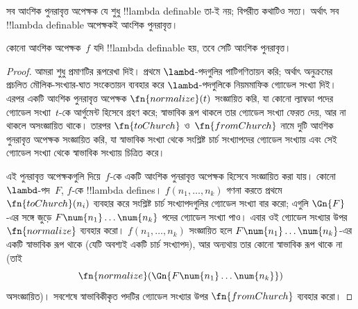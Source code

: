 \documentclass[../../../include/open-logic-section]{subfiles}
\begin{document}

সব আংশিক পুনরাবৃত্ত অপেক্ষক যে শুধু !!{lambda definable} তা-ই নয়;
বিপরীত কথাটিও সত্য। অর্থাৎ সব !!{lambda definable} অপেক্ষকই আংশিক
পুনরাবৃত্ত।

\begin{thm}
   কোনো আংশিক অপেক্ষক~$f$ যদি
  !!{lambda definable} হয়, তবে সেটি আংশিক পুনরাবৃত্ত।
\end{thm}

\begin{proof}
  আমরা শুধু প্রমাণটির রূপরেখা দিই। প্রথমে $\lambd$-পদগুলির পাটিগণিতায়ন
  করি; অর্থাৎ অনুক্রমের প্রচলিত মৌলিক-সংখ্যার-ঘাত সংকেতায়ন ব্যবহার করে
  $\lambd$-পদগুলিকে নিয়মমাফিক গ্যোডেল সংখ্যা দিই। এরপর একটি আংশিক
  পুনরাবৃত্ত অপেক্ষক $\fn{normalize}(t)$ সংজ্ঞায়িত করি, যা কোনো ল্যাম্বডা
  পদের গ্যোডেল সংখ্যা~$t$-কে আর্গুমেন্ট হিসেবে গ্রহণ করে; স্বাভাবিক রূপ
  থাকলে তার গ্যোডেল সংখ্যা ফেরত দেয়, আর না থাকলে অসংজ্ঞায়িত থাকে। তারপর
  $\fn{toChurch}$ ও~$\fn{fromChurch}$ নামে দুটি আংশিক পুনরাবৃত্ত অপেক্ষক
  সংজ্ঞায়িত করি, যা স্বাভাবিক সংখ্যা থেকে সংশ্লিষ্ট চার্চ সংখ্যাপদের
  গ্যোডেল সংখ্যায় এবং সেই গ্যোডেল সংখ্যা থেকে স্বাভাবিক সংখ্যায় চিত্রিত
  করে।

  এই পুনরাবৃত্ত অপেক্ষকগুলি দিয়ে~$f$-কে একটি আংশিক পুনরাবৃত্ত অপেক্ষক
  হিসেবে সংজ্ঞায়িত করা যায়। কোনো $\lambd$-পদ~$F$, $f$-কে
  !!{lambda define}s। $f(n_1, \dots, n_k)$ গণনা করতে প্রথমে
  $\fn{toChurch}(n_i)$ ব্যবহার করে সংশ্লিষ্ট চার্চ সংখ্যাপদগুলির গ্যোডেল
  সংখ্যা বার করো; এগুলি $\Gn{F}$-এর সঙ্গে জুড়ে
  $F \num{n_1}\dots\num{n_k}$ পদের গ্যোডেল সংখ্যা পাও। এবার ওই গ্যোডেল
  সংখ্যার উপর $\fn{normalize}$ ব্যবহার করো। $f(n_1, \dots, n_k)$
  সংজ্ঞায়িত হলে $F \num{n_1}\dots\num{n_k}$-এর একটি স্বাভাবিক রূপ
  থাকে (যেটি অবশ্যই একটি চার্চ সংখ্যাপদ), আর অন্যথায় তার কোনো স্বাভাবিক
  রূপ থাকে না (তাই
  \[\fn{normalize}(\Gn{F\num{n_1}\dots\num{n_k}})\]
  অসংজ্ঞায়িত)। সবশেষে স্বাভাবিকীকৃত পদটির গ্যোডেল সংখ্যার উপর
  $\fn{fromChurch}$ ব্যবহার করো।
\end{proof}
\end{document}
